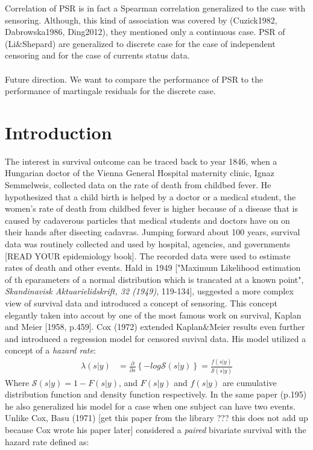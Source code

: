 \documentclass[]{article}
\begin{document}
Correlation of PSR is in fact a Spearman correlation generalized to the case with sensoring. Although, this kind of association was covered by (Cuzick1982, Dabrowska1986, Ding2012), they mentioned only a continuous case. PSR of (Li\&Shepard) are generalized to discrete case for the case of independent censoring and for the case of currents status data.\\
~\\
Future direction. We want to compare the performance of PSR to the performance of martingale residuals for the discrete case.

\section*{Introduction}
The interest in survival outcome can be traced back to year 1846, when a Hungarian doctor of the Vienna General Hospital maternity clinic, Ignaz Semmelweis, collected data on the rate of death from childbed fever. He hypothesized that a child birth is helped by a doctor or a medical student, the women's rate of death from childbed fever is higher because of a disease that is caused by cadaverous particles that medical students and doctors have on on their hands after disecting cadavras. Jumping forward about 100 years, survival data was routinely collected and used by hospital, agencies, and governments [READ YOUR epidemiology book]. The recorded data were used to estimate rates of death and other events. Hald in 1949 ["Maximum Likelihood estimation of th eparameters of a normal distribution which is trancated at a known point", \emph{Skandinavisk Aktuarielidskrift, 32 (1949)}, 119-134], usggested a more complex view of survival data and introduced a concept of sensoring. This concept elegantly taken into accout by one of the most famous work on survival, Kaplan and Meier [1958, p.459]. Cox (1972) extended Kaplan\&Meier results even further and introduced a regression model for censored suvival data. His model utilized a concept of a \emph{hazard rate}:
$$
\begin{aligned}
	\lambda(s|y) &= \frac{\partial}{\partial s}\left\{  -log \mathcal{S}(s|y)  \right\} =
	             \frac{f(s|y)}{\mathcal{S}(s|y)}
\end{aligned}
$$
Where $\mathcal{S}(s|y) = 1-F(s|y)$, and $F(s|y)$ and $f(s|y)$ are cumulative distribution function and density function respectively. In the same paper (p.195) he also generalized his model for a case when one subject can have two events.\\
Unlike Cox, Basu (1971) [get this paper from the library ??? this does not add up because Cox wrote his paper later] considered a \emph{paired} bivariate survival with the hazard rate defined as:
\end{document}

